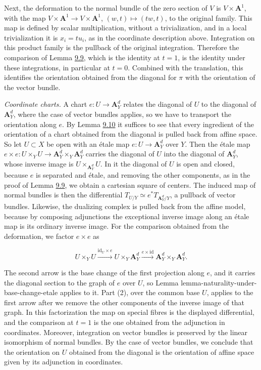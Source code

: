 \documentclass[11pt]{article}
\begin{document}
Next, the deformation to the normal bundle of the zero section of \(V\) is \(V\times\mathbf A^1\), with the map \(V\times\mathbf A^1\to V\times\mathbf A^1\), \((w,t)\mapsto(tw,t)\), to the original family. This map is defined by scalar multiplication, without a trivialization, and in a local trivialization it is \(x_i=tu_i\), as in the coordinate description above. Integration on this product family is the pullback of the original integration. Therefore the comparison of Lemma \hyperref[bp29]{9.9}, which is the identity at \(t=1\), is the identity under these integrations, in particular at \(t=0\). Combined with the translation, this identifies the orientation obtained from the diagonal for \(\pi\) with the orientation of the vector bundle.

\emph{Coordinate charts.} A chart \(e:U\to\mathbf A^d_Y\) relates the diagonal of \(U\) to the diagonal of \(\mathbf A^d_Y\), where the case of vector bundles applies, so we have to transport the orientation along \(e\). By Lemma \hyperref[bp32]{9.10} it suffices to see that every ingredient of the orientation of a chart obtained from the diagonal is pulled back from affine space. So let \(U\subset X\) be open with an étale map \(e:U\to\mathbf A^d_Y\) over \(Y\). Then the étale map \(e\times e:U\times_YU\to\mathbf A^d_Y\times_Y\mathbf A^d_Y\) carries the diagonal of \(U\) into the diagonal of \(\mathbf A^d_Y\), whose inverse image is \(U\times_{\mathbf A^d_Y}U\). In it the diagonal of \(U\) is open and closed, because \(e\) is separated and étale, and removing the other components, as in the proof of Lemma \hyperref[bp29]{9.9}, we obtain a cartesian square of centers. The induced map of normal bundles is then the differential \(T_{U/Y}\simeq e^*T_{\mathbf A^d_Y/Y}\), a pullback of vector bundles. Likewise, the dualizing complex is pulled back from the affine model, because by composing adjunctions the exceptional inverse image along an étale map is its ordinary inverse image. For the comparison obtained from the deformation, we factor \(e\times e\) as

\[
U\times_YU\xrightarrow{\mathrm{id}_U\times e}
U\times_Y\mathbf A^d_Y\xrightarrow{e\times\mathrm{id}}
\mathbf A^d_Y\times_Y\mathbf A^d_Y.
\]

The second arrow is the base change of the first projection along \(e\), and it carries the diagonal section to the graph of \(e\) over \(U\), so Lemma lemma-naturality-under-base-change-etale applies to it. Part (2), over the common base \(U\), applies to the first arrow after we remove the other components of the inverse image of that graph. In this factorization the map on special fibres is the displayed differential, and the comparison at \(t=1\) is the one obtained from the adjunction in coordinates. Moreover, integration on vector bundles is preserved by the linear isomorphism of normal bundles. By the case of vector bundles, we conclude that the orientation on \(U\) obtained from the diagonal is the orientation of affine space given by its adjunction in coordinates.
\end{document}
